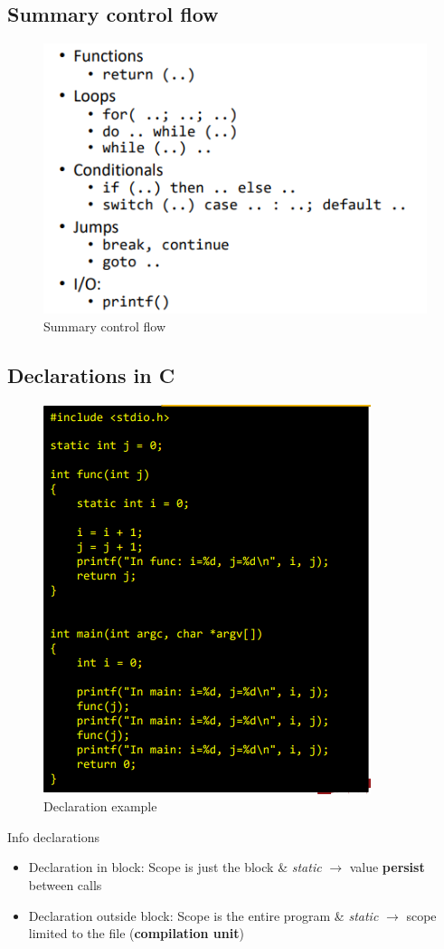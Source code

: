 \documentclass[a4paper,10pt]{article}
\begin{document}
\subsection{Summary control flow}
\begin{figure}[h!]
    \centering
    \includegraphics[width=0.7\linewidth]{e8.png}
    \caption{Summary control flow}
    \label{fig:enter-label}
\end{figure}

\pagebreak
\subsection{Declarations in C}
\begin{figure}[!h]
    \centering
    \includegraphics[width=0.75\linewidth]{e9.png}
    \caption{Declaration example}
    \label{fig:enter-label}
\end{figure}
\begin{tipbox}
    {Info declarations}
    \begin{itemize}
        \item Declaration in block: Scope is just the block \& \textit{static} $\rightarrow$ value \textbf{persist} between calls
        \item Declaration outside block: Scope is the entire program \& \textit{static} $\rightarrow$ scope limited to the file (\textbf{compilation unit})
    \end{itemize}
\end{tipbox}
\end{document}
